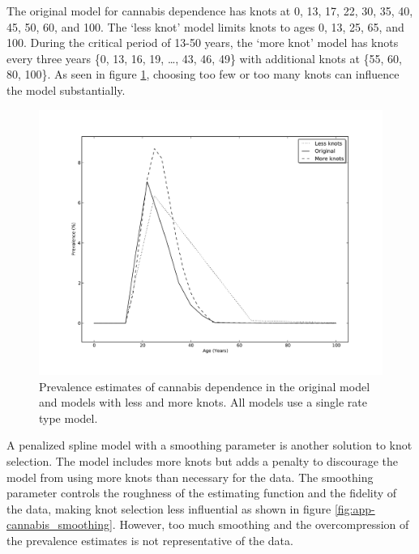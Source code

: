 The original model for cannabis dependence has knots at 0, 13, 17, 22, 30, 35, 40, 45, 50, 60, and 100.  The `less knot' model limits knots to ages 0, 13, 25, 65, and 100.   During the critical period of 13-50 years, the `more knot' model has knots every three years \{0, 13, 16, 19, \ldots, 43, 46, 49\} with additional knots at \{55, 60, 80, 100\}.  As seen in figure \ref{fig:app-cannabis_knots}, choosing too few or too many knots can influence the model substantially.

    \begin{figure}[h]
        \begin{center}
            \includegraphics[width=\textwidth]{applications/cannabis_dependence-knots.pdf}
            \caption{Prevalence estimates of cannabis dependence in the original model and models with less and more knots.  All models use a single rate type model. }
        \label{fig:app-cannabis_knots}
        \end{center}
    \end{figure}

A penalized spline model with a smoothing parameter is another solution to knot selection.  The model includes more knots but adds a penalty to discourage the model from using more knots than necessary for the data.  The smoothing parameter controls the roughness of the estimating function and the fidelity of the data, making knot selection less influential as shown in figure \ref{fig:app-cannabis_smoothing}.  However, too much smoothing and the overcompression of the prevalence estimates is not representative of the data.

